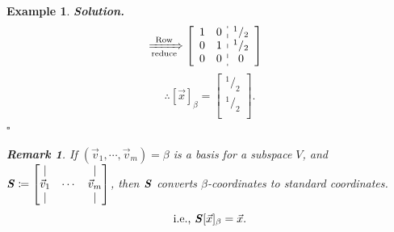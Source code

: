 \documentclass[12pt, a4paper]{article}
\newtheorem{eg}{Example}[subsection]
\newenvironment*{sol}{\indent\textbf{Solution. }}{\hfill{$\square$}\par}
\newtheorem*{rmk}{\indent Remark}
\def\vecx{\vec{x}}
\def\vecv{\vec{v}}
\def\matrixS{\textbf{\emph{S}}}
\begin{document}
\begin{eg}
\begin{sol}
$$\begin{aligned}
			&\xRightarrow[\text{reduce}]{\text{Row}}\left[\begin{array}{c:c}\begin{matrix}1&0\\0&1\\0&0\end{matrix}&\begin{matrix}^1/_2\\^1/_2\\0\end{matrix}\end{array}\right]
		\end{aligned}$$
		\[\therefore[\vecx]_\beta=\begin{bmatrix}^1/_2\\^1/_2\\\end{bmatrix}.\]
	\end{sol}
	\begin{rmk} If $(\vecv_1,\cdots,\vecv_m)=\beta$ is a basis for a subspace $V$, and $\matrixS\coloneqq\begin{bmatrix}|&&|\\\vecv_1&\cdots&\vecv_m\\|&&|\end{bmatrix}$, then $\matrixS$ converts $\beta$-coordinates to standard coordinates. \[\text{i.e., }\matrixS[\vecx]_\beta=\vecx.\]
	\end{rmk}
\end{eg}
\end{document}
